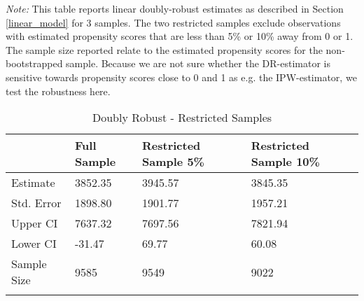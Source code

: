 \begin{scriptsize}
			\def\sym#1{\ifmmode^{#1}\else\(^{#1}\)\fi}
			\begin{ThreePartTable}
				\begin{TableNotes}
					\begin{scriptsize}
					\item \textit{Note:} This table reports linear doubly-robust estimates as described in Section \ref{linear_model}  for 3 samples. The two restricted samples exclude observations with estimated propensity scores that are less than 5\% or 10\% away from 0 or 1. The sample size reported relate to the estimated propensity scores for the non-bootstrapped sample.
Because we are not sure whether the DR-estimator is sensitive towards propensity scores close to 0 and 1 as  e.g. the IPW-estimator, we test the robustness here.
					\end{scriptsize}
				\end{TableNotes}
				
				\begin{longtable}{l C{1.45cm} C{1.45cm} C{1.45cm}}
					\caption{Doubly Robust - Restricted Samples}\label{tab_dr_robustness}\\
					  \hline
 & Full Sample & Restricted Sample 5\% & Restricted Sample 10\% \\ 
  \hline
Estimate & 3852.35 & 3945.57 & 3845.35 \\ 
  Std. Error & 1898.80 & 1901.77 & 1957.21 \\ 
  Upper CI & 7637.32 & 7697.56 & 7821.94 \\ 
  Lower CI & -31.47 & 69.77 & 60.08 \\ 
  \hline
  Sample Size & 9585 & 9549 & 9022\\
    \hline
				\insertTableNotes \\
				\end{longtable} 

				
			\end{ThreePartTable}
	\end{scriptsize}

